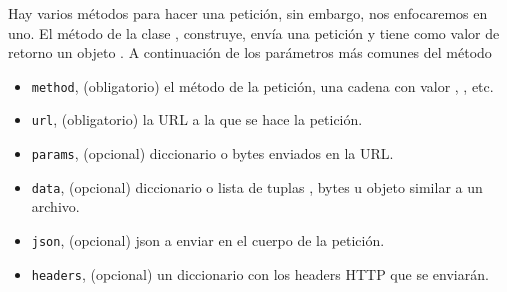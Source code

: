 \begin{sphinxVerbatim}[commandchars=\\\{\}]
 
  
\PYG{p}{[}\PYG{p}{]}
\end{sphinxVerbatim}

Hay varios métodos para hacer una petición, sin embargo, nos enfocaremos en uno.
El método  de la clase , construye, envía una petición
y tiene  como valor de retorno un objeto .
A continuación de los parámetros más comunes del método 
\begin{itemize}
\item {} 
\texttt{method}, (obligatorio) el método de la petición, una cadena con valor , , etc.

\item {} 
\texttt{url}, (obligatorio) la URL a la que se hace la petición.

\item {} 
\texttt{params}, (opcional) diccionario o bytes enviados en la URL.

\item {} 
\texttt{data}, (opcional)  diccionario o lista de tuplas , bytes u objeto similar a un archivo.

\item {} 
\texttt{json}, (opcional) json a enviar en el cuerpo de la petición.

\item {} 
\texttt{headers}, (opcional) un diccionario con los headers HTTP que se enviarán.

\end{itemize}

